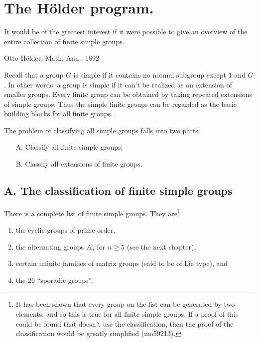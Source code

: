 \documentclass[a4paper,11pt,final]{memoir}%
\theoremstyle{nonumberplain}
\begin{document}
\section{The H\"{o}lder program.}

\setlength{\epigraphwidth}{3in} \setlength{\epigraphrule}{0pt}
\epigraph{It would be of the greatest interest if it were possible to give an overview of the entire
collection of finite simple groups.}{Otto H\"older, Math. Ann., 1892}

Recall that a group $G$ is simple if it contains no normal subgroup except $1
$ and $G$. In other words, a group is simple if it can't be realized as an
extension of smaller groups. Every finite group can be obtained by taking
repeated extensions of simple groups. Thus the simple finite groups can be
regarded as the basic building blocks for all finite groups.

The problem of classifying all simple groups falls into two parts:

\begin{itemize}
\item[A.] Classify all finite simple groups;

\item[B.] Classify all extensions of finite groups.
\end{itemize}

\subsection{A. The classification of finite simple groups}

\label{classification}There is a complete list of finite simple groups. They
are\footnote{It has been shown that every group on the list can be generated
by two elements, and so this is true for all finite simple groups. If a proof
of this could be found that doesn't use the classification, then the proof of
the classification would be greatly simplified (mo59213).}

\begin{enumerate}
\item the cyclic groups of prime order,

\item the alternating groups $A_{n}$ for $n\geq5$ (see the next chapter),

\item certain infinite families of matrix groups (said to be of Lie type), and

\item the $26$ \textquotedblleft sporadic groups\textquotedblright.
\end{enumerate}
\end{document}
